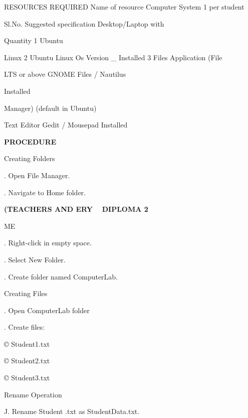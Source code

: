 \documentclass[10pt,a4paper]{article}
\begin{document}
\noindent RESOURCES REQUIRED          Name of resource          Computer System            1 per student\par
\noindent Sl.No.                      Suggested specification   Desktop/Laptop with\par
\noindent Quantity 1                Ubuntu\par

\noindent Linux 2                     Ubuntu Linux Os Version   \_ Installed 3              Files Application (File\par
{} LTS or above                                   GNOME Files / Nautilus\par
\noindent Installed\par

\noindent Manager) (default in Ubuntu)\par

                                                     Text Editor Gedit / Mousepad Installed\par

\medskip\noindent\textbf{PROCEDURE}\par
\noindent Creating Folders\par
{}. Open File Manager.\par
{}. Navigate to Home folder.\par
\medskip\noindent\textbf{(TEACHERS AND ERY ~ DIPLOMA 2}\par
\noindent ME\par
{}. Right-click in empty space.\par
{}. Select New Folder.\par
{}. Create folder named ComputerLab.\par
\noindent Creating Files\par
{}. Open ComputerLab folder\par
{}. Create files:\par
\noindent © Student1.txt\par
\noindent © Student2.txt\par
\noindent © Student3.txt\par
\noindent Rename Operation\par

\noindent J. Rename Student                                     .txt as StudentData.txt.\par
\end{document}

